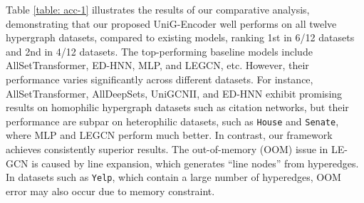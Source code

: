 \documentclass[review]{elsarticle}
\begin{document}
\begin{table}[htbp]
  \centering
  \caption{\textbf{Results on graphs.} Mean accuracy (\%)  standard deviation is shown for each method. For each dataset, we mark the winner's score in bold and highlight the runner-up's with underline.}
  \label{table: acc-2}
\end{table}

Table \ref{table: acc-1} illustrates the results of our comparative analysis, demonstrating that our proposed UniG-Encoder well performs on all twelve hypergraph datasets, compared to existing models, ranking 1st in 6/12 datasets and 2nd in 4/12 datasets. The top-performing baseline models include AllSetTransformer, ED-HNN, MLP, and LEGCN, etc. However, their performance varies significantly across different datasets. For instance, AllSetTransformer, AllDeepSets, UniGCNII, and ED-HNN exhibit promising results on homophilic hypergraph datasets such as citation networks, but their performance are subpar on heterophilic datasets, such as \texttt{House} and \texttt{Senate}, where MLP and LEGCN perform much better. In contrast, our framework achieves consistently superior results. The out-of-memory (OOM) issue in LE-GCN is caused by line expansion, which generates ``line nodes'' from hyperedges. In datasets such as \texttt{Yelp}, which contain a large number of hyperedges, OOM error may also occur due to memory constraint.
\end{document}
